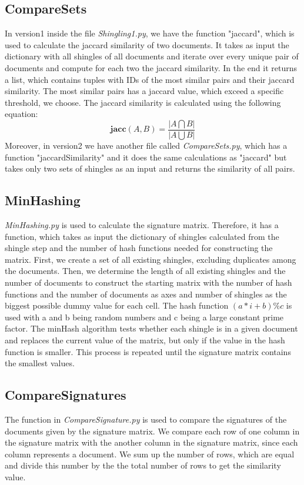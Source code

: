 \documentclass[a4paper, 11pt]{article}
\begin{document}
 \subsection{CompareSets}
 In version1 inside the file \textit{Shingling1.py}, we have the function "jaccard", which is used to calculate the jaccard similarity of two documents. It takes as input the dictionary with all shingles of all documents and iterate over every unique pair of documents and compute for each two the jaccard similarity. In the end it returns a list, which contains tuples with IDs of the most similar pairs and their jaccard similarity. The most similar pairs has a jaccard value, which exceed a specific threshold, we choose. The jaccard similarity is calculated using the following equation: \\
 \begin{equation}
 \mathbf{jacc}(A,B) = \frac{\mid A \bigcap B|}{|A \bigcup B|}
 \end{equation}
Moreover, in version2 we have another file called \textit{CompareSets.py}, which has a function "jaccardSimilarity" and it does the same calculations as "jaccard" but takes only two sets of shingles as an input and returns the similarity of all pairs.
 
 \subsection{MinHashing}
 \textit{MinHashing.py} is used to calculate the signature matrix. Therefore, it has a function, which takes as input the dictionary of shingles calculated from the shingle step and the number of hash functions needed for constructing the matrix. First, we create a set of all existing shingles, excluding duplicates among the documents. Then, we determine the length of all existing shingles and the number of documents to construct the starting matrix with the number of hash functions and the number of documents as axes and number of shingles as the biggest possible dummy value for each cell. The hash function  \( (a * i + b) \% c \) is used with a and b being random numbers and c being a large constant prime factor. The minHash algorithm tests whether each shingle is in a given document and replaces the current value of the matrix, but only if the value in the hash function is smaller. This process is repeated until the signature matrix contains the smallest values.
 
\subsection{CompareSignatures}
The function in \textit{CompareSignature.py} is used to compare the signatures of the documents given by the signature matrix. We compare each row of one column in the signature matrix with the another column in the signature matrix, since each column represents a document. We sum up the number of rows, which are equal and divide this number by the the total number of rows to get the similarity value.
\end{document}
